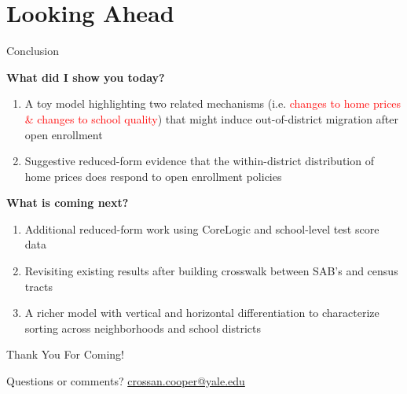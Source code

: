 \documentclass[notes,11pt, aspectratio=169]{beamer}
\newenvironment{wideitemize}{\itemize\addtolength{\itemsep}{10pt}}{\enditemize}
\begin{document}

\section{Looking Ahead}


\begin{frame}{Conclusion}
\begin{wideitemize}
    \item \textbf{What did I show you today?}
    \begin{enumerate}
    \item A toy model highlighting two related mechanisms (i.e. \textcolor{red}{changes to home prices \& changes to school quality}) that might induce out-of-district migration after open enrollment
    \item Suggestive reduced-form evidence that the within-district distribution of home prices does respond to open enrollment policies
    \end{enumerate}
    \item \textbf{What is coming next?}
    \begin{enumerate}
    \item Additional reduced-form work using CoreLogic and school-level test score data
    \item Revisiting existing results after building crosswalk between SAB's and census tracts
    \item A richer model with vertical and horizontal differentiation to characterize sorting across neighborhoods and school districts
    \end{enumerate}
\end{wideitemize}
\end{frame}


\begin{frame}
  \centering \Huge
  Thank You For Coming!

  \bigskip 
  \centering \small
  Questions or comments? \url{crossan.cooper@yale.edu}
\end{frame}
\end{document}
